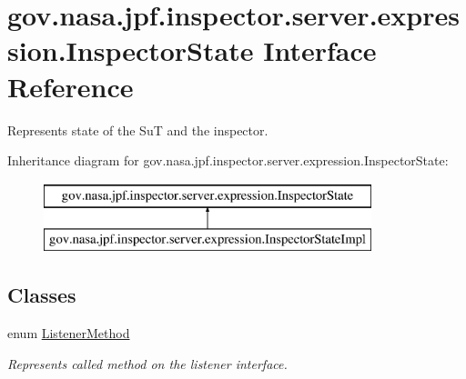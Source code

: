\hypertarget{interfacegov_1_1nasa_1_1jpf_1_1inspector_1_1server_1_1expression_1_1_inspector_state}{}\section{gov.\+nasa.\+jpf.\+inspector.\+server.\+expression.\+Inspector\+State Interface Reference}
\label{interfacegov_1_1nasa_1_1jpf_1_1inspector_1_1server_1_1expression_1_1_inspector_state}


Represents state of the SuT and the inspector.  


Inheritance diagram for gov.\+nasa.\+jpf.\+inspector.\+server.\+expression.\+Inspector\+State\+:\begin{figure}[H]
\begin{center}
\leavevmode
\includegraphics[height=2.000000cm]{interfacegov_1_1nasa_1_1jpf_1_1inspector_1_1server_1_1expression_1_1_inspector_state}
\end{center}
\end{figure}
\subsection*{Classes}
\begin{DoxyCompactItemize}
\item 
enum \hyperlink{enumgov_1_1nasa_1_1jpf_1_1inspector_1_1server_1_1expression_1_1_inspector_state_1_1_listener_method}{Listener\+Method}
\begin{DoxyCompactList}\small\item\em Represents called method on the listener interface. \end{DoxyCompactList}\end{DoxyCompactItemize}
